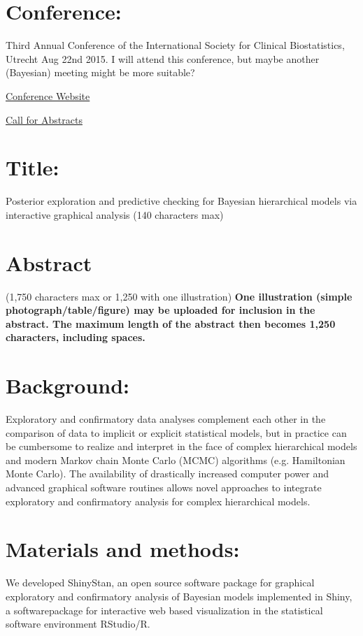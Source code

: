\documentclass[11pt,notitlepage]{article}
\begin{document}
\section*{Conference:}

Third Annual Conference of the International Society for Clinical Biostatistics, Utrecht Aug 22nd 2015. I will attend this conference, but maybe another (Bayesian) meeting might be more suitable?

\href{http://www.iscb.info/ISCB2015.html}{Conference Website}

\href{http://www.iscb2015.info/abstract-submission}{Call for Abstracts}



\section*{Title:}

Posterior exploration and predictive checking for Bayesian hierarchical models via interactive graphical analysis (140 characters max)
\section*{Abstract}
(1,750 characters max or 1,250 with one illustration) \textbf{One illustration (simple photograph/table/figure) may be uploaded for inclusion in the abstract. The maximum length of the abstract then becomes 1,250 characters, including spaces.}

\section*{Background:}
Exploratory and confirmatory data analyses complement each other in the comparison of data to implicit or explicit statistical models, but in practice can be cumbersome to realize and interpret in the face of complex hierarchical models and modern Markov chain Monte Carlo (MCMC) algorithms (e.g. Hamiltonian Monte Carlo). The availability of drastically increased computer power and advanced graphical software routines allows novel approaches to integrate exploratory and confirmatory analysis for complex hierarchical models.

\section*{Materials and methods:}
We developed ShinyStan, an open source software package for graphical exploratory and confirmatory analysis of Bayesian models implemented in Shiny, a softwarepackage for interactive web based visualization in the statistical software environment RStudio/R.  
\end{document}
